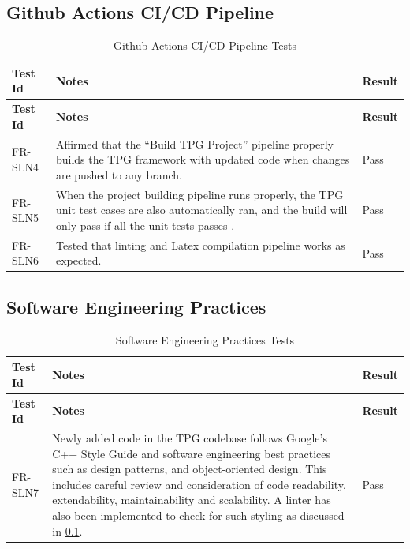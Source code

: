 \documentclass[12pt, titlepage]{article}
\begin{document}
\pagebreak 

\subsection{Github Actions CI/CD Pipeline}\label{github_actions}

\begin{center}
  \begin{longtable}{|p{2cm}|p{8cm}|p{2cm}|}
    \caption{Github Actions CI/CD Pipeline Tests} \\
      \hline
  \textbf{Test Id} & \textbf{Notes} & \textbf{Result} \\
  \hline
  \endfirsthead
  \hline
  \textbf{Test Id} & \textbf{Notes} & \textbf{Result} \\
  \hline
  \endhead
      FR-SLN4 & Affirmed that the “Build TPG Project” pipeline properly builds the TPG framework with updated code when changes are pushed to any branch. & Pass \\
  \hline
  FR-SLN5 & When the project building pipeline runs properly, the TPG unit test cases are also automatically ran, and the build will only pass if all the unit tests passes
  . & Pass \\
  \hline

  FR-SLN6 & Tested that linting and Latex compilation pipeline works as expected. & Pass \\

  \hline
  \end{longtable}
\end{center}

\subsection{Software Engineering Practices}\label{software_engineering_practices}

\begin{center}
  \begin{longtable}{|p{2cm}|p{8cm}|p{2cm}|}
    \caption{Software Engineering Practices Tests} \\
  \hline
  \textbf{Test Id} & \textbf{Notes} & \textbf{Result} \\
  \hline
  \endfirsthead
  \hline
  \textbf{Test Id} & \textbf{Notes} & \textbf{Result} \\
  \hline
  \endhead
  FR-SLN7 & Newly added code in the TPG codebase follows Google's C++ Style Guide and software engineering best practices such as design patterns, and object-oriented design. This includes careful review and consideration of code readability, extendability, maintainability and scalability. A linter has also been implemented to check for such styling as discussed in \ref{github_actions}. & Pass \\
  \hline
  \end{longtable}
\end{center}
\end{document}
